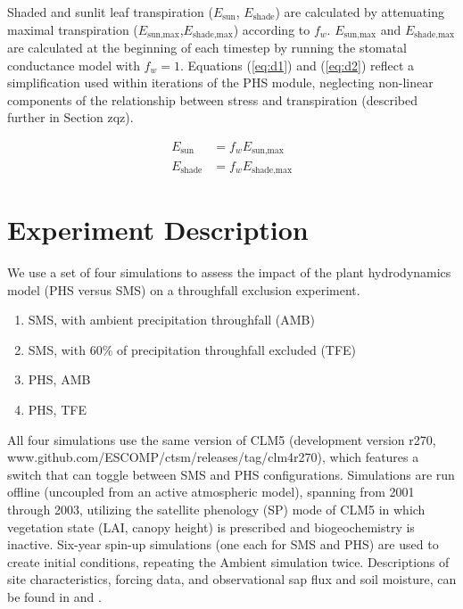 \documentclass[draft,linenumbers]{agujournal}
\begin{document}
     Shaded and sunlit leaf transpiration ($E_{\text{sun}}$, $E_{\text{shade}}$) are calculated by attenuating maximal transpiration ($E_{\text{sun,max}}$,$E_{\text{shade,max}}$) according to $f_w$. 
     $E_{\text{sun,max}}$ and $E_{\text{shade,max}}$ are calculated at the beginning of each timestep by running the stomatal conductance model with $f_w=1$.
     Equations (\ref{eq:d1}) and (\ref{eq:d2}) reflect a simplification used within iterations of the PHS module, 
     neglecting non-linear components of the relationship between stress and transpiration (described further in Section zqz).
     
     \begin{linenomath*}
     \begin{equation}
     \begin{aligned}
     \label{eq:d2}
     E_{\text{sun}} & = f_wE_{\text{sun,max}} \\
     E_{\text{shade}} & = f_wE_{\text{shade,max}}
     \end{aligned}     
     \end{equation}
     \end{linenomath*}
     

 

 
\section{Experiment Description}
\label{sect:exp}

We use a set of four simulations to assess the impact of the plant hydrodynamics model (PHS versus SMS) on a throughfall exclusion experiment.
\begin{enumerate}
\item SMS, with ambient precipitation throughfall (AMB)
\item SMS, with 60\% of precipitation throughfall excluded (TFE)
\item PHS, AMB
\item PHS, TFE
\end{enumerate}

All four simulations use the same version of CLM5
(development version r270, www.github.com/ESCOMP/ctsm/releases/tag/clm4\textunderscore r270),
which features a switch that can toggle between SMS and PHS configurations.
Simulations are run offline (uncoupled from an active atmospheric model), spanning from 2001 through 2003, utilizing the satellite phenology (SP) mode of CLM5 in which vegetation state (LAI, canopy height) is prescribed and biogeochemistry is inactive. Six-year spin-up simulations (one each for SMS and PHS) are used to create initial conditions, repeating the Ambient simulation twice. Descriptions of site characteristics, forcing data, and observational sap flux and soil moisture, can be found in \cite{fisher2007} and \cite{fisher2008}.
\end{document}
